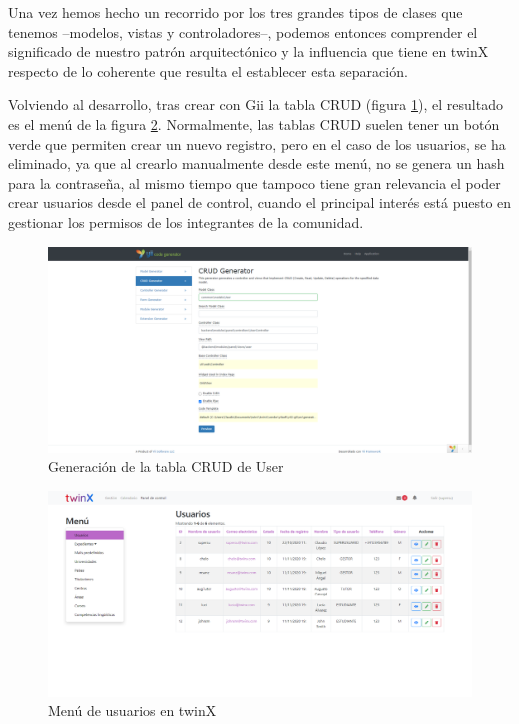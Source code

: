 Una vez hemos hecho un recorrido por los tres grandes tipos de clases que tenemos --modelos, vistas y controladores--, podemos entonces comprender el significado de nuestro patrón arquitectónico y la influencia que tiene en twinX respecto de lo coherente que resulta el establecer esta separación.

Volviendo al desarrollo, tras crear con Gii la tabla CRUD (figura \ref{fig:giicruduser}), el resultado es el menú de la figura \ref{fig:usuariostwinX}. Normalmente, las tablas CRUD suelen tener un botón verde que permiten crear un nuevo registro, pero en el caso de los usuarios, se ha eliminado, ya que al crearlo manualmente desde este menú, no se genera un hash para la contraseña, al mismo tiempo que tampoco tiene gran relevancia el poder crear usuarios desde el panel de control, cuando el principal interés está puesto en gestionar los permisos de los integrantes de la comunidad.

\begin{figure}
	\centering
	\includegraphics[width=\textwidth]{img/Capturas de twinX/gii_crud_user}
	\caption{Generación de la tabla CRUD de User}
	\label{fig:giicruduser}
\end{figure}


\begin{figure}
	\centering
	\includegraphics[width=\textwidth]{img/Capturas de twinX/usuarios_twinX}
	\caption{Menú de usuarios en twinX}
	\label{fig:usuariostwinX}
\end{figure}

